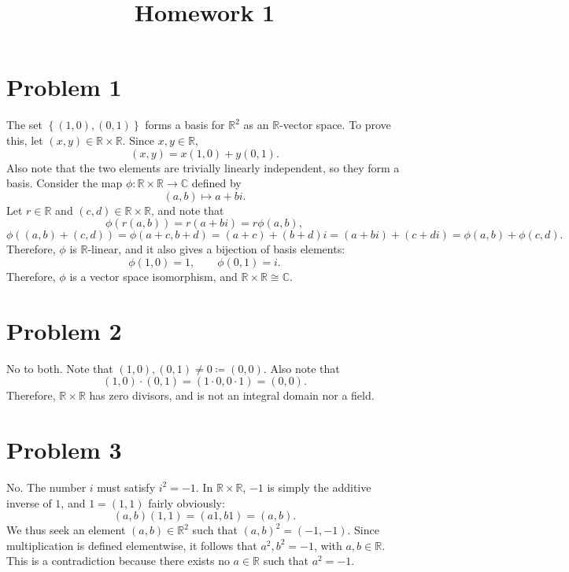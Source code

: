 \documentclass[11pt, letterpaper]{article}
\title{Homework 1}
\begin{document}
\makeproblem
\section*{Problem 1}
The set $\left\{ (1,0),(0,1) \right\} $ forms a basis for $\mathbb{R} ^2$ as an $\mathbb{R} $-vector space. To prove this, let $(x,y)\in\mathbb{R}\times \mathbb{R}  $. Since $x,y\in\mathbb{R} $,
\[
	(x,y)=x(1,0)+y(0,1)
.\]
Also note that the two elements are trivially linearly independent, so they form a basis. Consider the map $\phi :\mathbb{R} \times \mathbb{R} \to \mathbb{C} $ defined by
\[
	(a,b)\mapsto a+bi
.\]
Let $r\in\mathbb{R} $ and $(c,d)\in\mathbb{R} \times \mathbb{R} $, and note that
\[
	\phi (r(a,b))=r(a+bi)=r\phi (a,b),
\]
\[
	\phi ((a,b)+(c,d))=\phi (a+c,b+d)=(a+c)+(b+d)i=(a+bi)+(c+di)=\phi (a,b)+\phi (c,d)
.\]
Therefore, $\phi $ is $\mathbb{R} $-linear, and it also gives a bijection of basis elements:
\[
	\phi (1,0)=1,\qquad \phi (0,1)=i
.\]
Therefore, $\phi $ is a vector space isomorphism, and $\mathbb{R} \times \mathbb{R} \cong \mathbb{C} $.
\section*{Problem 2}
No to both. Note that $(1,0),(0,1)\neq 0\coloneqq (0,0)$. Also note that
\[
	(1,0)\cdot (0,1)=(1\cdot 0,0\cdot 1)=(0,0)
.\]
Therefore, $\mathbb{R} \times \mathbb{R} $ has zero divisors, and is not an integral domain nor a field.
\section*{Problem 3}
No. The number $i$ must satisfy $i^2=-1$. In $\mathbb{R} \times \mathbb{R} $, $-1$ is simply the additive inverse of $1$, and $1=(1,1)$ fairly obviously:
\[
	(a,b)(1,1)=(a1,b1)=(a,b)
.\]
We thus seek an element $(a,b)\in\mathbb{R}^2 $ such that $(a,b)^2=(-1,-1)$. Since multiplication is defined elementwise, it follows that $a^2,b^2=-1$, with $a,b\in\mathbb{R} $. This is a contradiction because there exists no $a\in\mathbb{R} $ such that $a^2=-1$.
\end{document}
